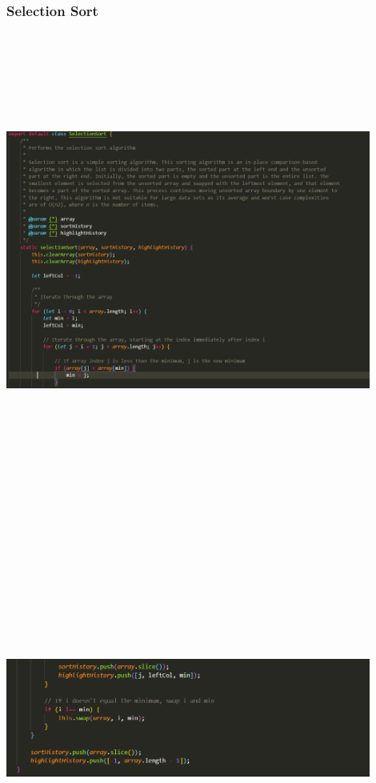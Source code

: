 \subsubsection{Selection Sort}
\begin{center}
    \includegraphics[width=12cm,height=15cm,keepaspectratio]{images/selectionsort1}
    \includegraphics[width=12cm,height=15cm,keepaspectratio]{images/selectionsort2}
\end{center}
